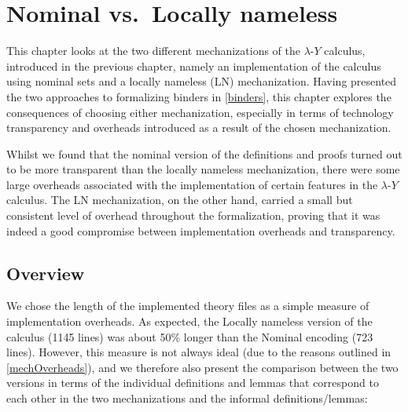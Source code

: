\documentclass[a4paper, 12pt, twoside]{style/ociamthesis}
\theoremstyle{plain}
\theoremstyle{definition}
\theoremstyle{remark}
\newcommand{\lamy}{\lambda\text{-}Y}
\begin{document}
\chapter{Nominal vs.~Locally nameless}\label{comp-isa}

\label{chap:compIsa}

This chapter looks at the two different mechanizations of the \(\lamy\)
calculus, introduced in the previous chapter, namely an implementation
of the calculus using nominal sets and a locally nameless (LN)
mechanization. Having presented the two approaches to formalizing
binders in \cref{binders}, this chapter explores the consequences of
choosing either mechanization, especially in terms of technology
transparency and overheads introduced as a result of the chosen
mechanization.

Whilst we found that the nominal version of the definitions and proofs
turned out to be more transparent than the locally nameless
mechanization, there were some large overheads associated with the
implementation of certain features in the \(\lamy\) calculus. The LN
mechanization, on the other hand, carried a small but consistent level
of overhead throughout the formalization, proving that it was indeed a
good compromise between implementation overheads and transparency.

\section{Overview}\label{overview-1}

We chose the length of the implemented theory files as a simple measure
of implementation overheads. As expected, the Locally nameless version
of the calculus (1145 lines) was about 50\% longer than the Nominal
encoding (723 lines). However, this measure is not always ideal (due to
the reasons outlined in \cref{mechOverheads}), and we therefore also
present the comparison between the two versions in terms of the
individual definitions and lemmas that correspond to each other in the
two mechanizations and the informal definitions/lemmas:

\newcommand{\lem}[1]{\bf{lemma}\ \it{#1}}
\newcommand{\fun}[1]{\bf{fun}\ \it{#1}}
\newcommand{\nfun}[1]{\bf{nominal\_function}\ \it{#1}}
\newcommand{\dat}[1]{\bf{datatype}\ \it{#1}}
\newcommand{\ndat}[1]{\bf{nominal\_datatype}\ \it{#1}}
\newcommand{\induct}[1]{\bf{inductive}\ \it{#1}}
\end{document}
